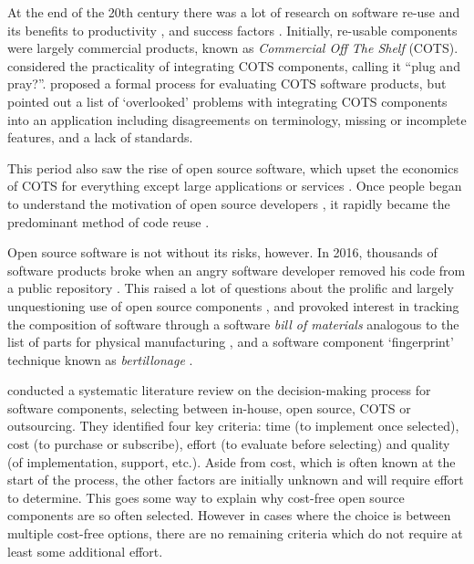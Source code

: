 At the end of the 20th century there was a lot of research on software re-use and its benefits to productivity \citep{Lim1994} \citep{Basili1996}, and success factors \citep{Frakes1994} \citep{Kim1998}.  Initially, re-usable components were largely commercial products, known as \emph{Commercial Off The Shelf} (COTS). \citet{Boehm1999} considered the practicality of integrating COTS components, calling it \enquote{plug and pray?}. \citet{Lawlis2001} proposed a formal process for evaluating COTS software products, but \citet{Torchiano2004} pointed out a list of `overlooked' problems with integrating COTS components into an application including disagreements on terminology, missing or incomplete features, and a lack of standards.

This period also saw the rise of open source software, which upset the economics of COTS for everything except large applications or services \citep{Lerner2002}. Once people began to understand the motivation of open source developers \citep{Hertel2003} \citep{Lakhani2003}, it rapidly became the predominant method of code reuse \citep{Mockus2007} \citep{Haefliger2008} \citep{Sojer2010}.

Open source software is not without its risks, however. In 2016, thousands of software products broke when an angry software developer removed his code from a public repository \citep{Williams2016}. This raised a lot of questions about the prolific and largely unquestioning use of open source components \citep{Abdalkareem2017}, and provoked interest in tracking the composition of software through a software \emph{bill of materials} analogous to the list of parts for physical manufacturing \citep{Xia2023}, and a software component `fingerprint' technique known as \emph{bertillonage} \citep{Davies2013}.

\citet{Badampudi2016} conducted a systematic literature review on the decision-making process for software components, selecting between in-house, open source, COTS or outsourcing. They identified four key criteria: time (to implement once selected), cost (to purchase or subscribe), effort (to evaluate before selecting) and quality (of implementation, support, etc.). Aside from cost, which is often known at the start of the process, the other factors are initially unknown and will require effort to determine. This goes some way to explain why cost-free open source components are so often selected. However in cases where the choice is between multiple cost-free options, there are no remaining criteria which do not require at least some additional effort.

